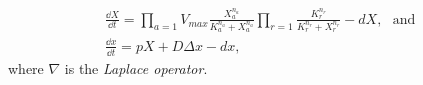 \begin{align}
  \frac{\dd X}{\dd t} = 
  \prod_{a=1} V_{max}\frac{X_a^{n_{a}}}{K_a^{n_a} + X_a^{n_a}}
  \prod_{r=1} \frac{K_r^{n_{r}}}{K_r^{n_r} + X_r^{n_r}} -
  dX, \ \ \ \text{and} \\
  \frac{\dd x}{\dd t} = pX + D\Delta x - dx,
  \label{eq:gene_expr_reg}
\end{align}
where $\nabla$ is the \textit{Laplace operator}.

% 

